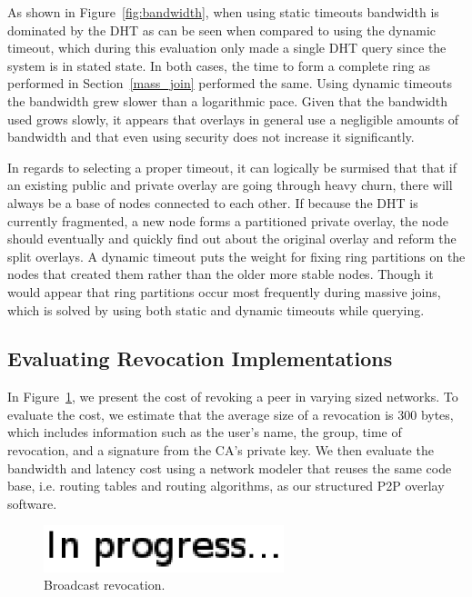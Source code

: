 \documentclass[conference]{IEEEtran}
\begin{document}
As shown in Figure~\ref{fig:bandwidth}, when using static timeouts bandwidth
is dominated by the DHT as can be seen when compared to using the dynamic
timeout, which during this evaluation only made a single DHT query since the
system is in stated state.  In both cases, the time to form a complete ring
as performed in Section~\ref{mass_join} performed the same.  Using dynamic
timeouts the bandwidth grew slower than a logarithmic pace.  Given that the
bandwidth used grows slowly, it appears that overlays in general use a negligible
amounts of bandwidth and that even using security does not increase it
significantly.

In regards to selecting a proper timeout, it can logically be surmised that
that if an existing public and private overlay are going through heavy churn,
there will always be a base of nodes connected to each other.  If because the DHT
is currently fragmented, a new node forms a partitioned private overlay, the node
should eventually and quickly find out about the original overlay and reform
the split overlays.  A dynamic timeout puts the weight for fixing ring partitions
on the nodes that created them rather than the older more stable nodes.  Though
it would appear that ring partitions occur most frequently during massive joins,
which is solved by using both static and dynamic timeouts while querying.

\subsection{Evaluating Revocation Implementations}
\label{evaluation_revocation}
In Figure~\ref{fig:broadcast_revocation}, we present the cost of revoking a
peer in varying sized networks.  To evaluate the cost, we estimate that the
average size of a revocation is 300 bytes, which includes information such
as the user's name, the group, time of revocation, and a signature from the
CA's private key.  We then evaluate the bandwidth and latency cost using a
network modeler that reuses the same code base, i.e. routing tables and routing
algorithms, as our structured P2P overlay software.  

\begin{figure}[h]
\centering
\includegraphics[width=2.75in]{in_progress.eps}
\caption{Broadcast revocation.}
\label{fig:broadcast_revocation}
\end{figure}
\end{document}
